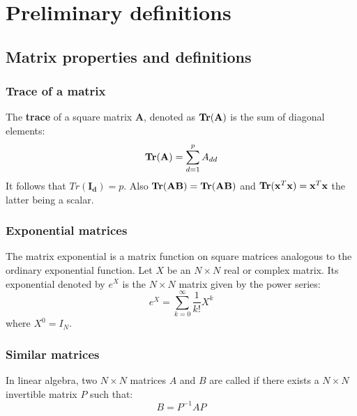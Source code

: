 \section{Preliminary definitions}
\subsection{Matrix properties and definitions}
\subsubsection{Trace of a matrix}
\label{trace}
The \textbf{trace} of a square matrix $\mathbf{A}$, denoted as $\mathbf{Tr}(\mathbf{A})$ is the sum of diagonal elements:
\begin{equation}
\mathbf{Tr}(\mathbf{A}) = \sum_{d=1}^p A_{dd}
\end{equation}
It follows that $Tr(\mathbf{I_d}) = p$.
Also $\mathbf{Tr}(\mathbf{AB}) = \mathbf{Tr}(\mathbf{AB})$ and $\mathbf{Tr}(\mathbf{x}^T\mathbf{x}) = \mathbf{x}^T\mathbf{x}$ the latter being a scalar.

\subsubsection{Exponential matrices}
\label{ExponentialMatrices}
\begin{definition}{} The matrix exponential is a matrix function on square matrices analogous to the ordinary exponential function. Let $X$ be an $N\times N$ real or complex matrix. Its exponential denoted by $e^X$ is the $N \times N$ matrix given by the power series:
\begin{equation}
e^X = \sum_{k=0}^\infty \frac{1}{k!} X^k
\end{equation}
where $X^0 = I_N$.
\end{definition}

\subsubsection{Similar matrices}
\label{MatrixSimilarity}
\begin{definition}{}In linear algebra, two $N\times N$ matrices $A$ and $B$ are called  if there exists a $N\times N$ invertible matrix $P$ such that:
\begin{equation}
B = P^{-1}AP
\end{equation}	
\end{definition}

